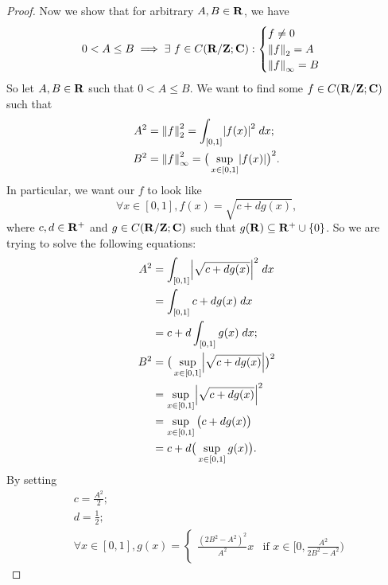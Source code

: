 \begin{proof}
  Now we show that for arbitrary \(A, B \in \R\), we have
  \[
    0 < A \leq B \implies \exists\ f \in C(\R / \Z ; \C) : \begin{cases}
      f \neq 0        \\
      \norm*{f}_2 = A \\
      \norm*{f}_{\infty} = B
    \end{cases}
  \]
  So let \(A, B \in \R\) such that \(0 < A \leq B\).
  We want to find some \(f \in C(\R / \Z ; \C)\) such that
  \begin{align*}
    A^2 & = \norm*{f}_2^2 = \int_{[0, 1]} \abs{f(x)}^2 \; dx;                  \\
    B^2 & = \norm*{f}_{\infty}^2 = \big(\sup_{x \in [0, 1]} \abs{f(x)}\big)^2.
  \end{align*}
  In particular, we want our \(f\) to look like
  \[
    \forall x \in [0, 1], f(x) = \sqrt{c + d g(x)},
  \]
  where \(c, d \in \R^+\) and \(g \in C(\R / \Z ; \C)\) such that \(g(\R) \subseteq \R^+ \cup \{0\}\).
  So we are trying to solve the following equations:
  \begin{align*}
    A^2 & = \int_{[0, 1]} \abs{\sqrt{c + dg(x)}}^2 \; dx           \\
        & = \int_{[0, 1]} c + dg(x) \; dx                          \\
        & = c + d \int_{[0, 1]} g(x) \; dx;                        \\
    B^2 & = \big(\sup_{x \in [0, 1]} \abs{\sqrt{c + dg(x)}}\big)^2 \\
        & = \sup_{x \in [0, 1]} \abs{\sqrt{c + dg(x)}}^2           \\
        & = \sup_{x \in [0, 1]} \big(c + dg(x)\big)                \\
        & = c + d \big(\sup_{x \in [0, 1]} g(x)\big).
  \end{align*}
  By setting
  \begin{align*}
     & c = \frac{A^2}{2};                                                                                                                                    \\
     & d = \frac{1}{2};                                                                                                                                      \\
     & \forall x \in [0, 1], g(x) = \begin{cases}
                                      \frac{(2 B^2 - A^2)^2}{A^2} x                    & \text{if } x \in [0, \frac{A^2}{2 B^2 - A^2})                         \\

\end{cases}
\end{align*}
\end{proof}
